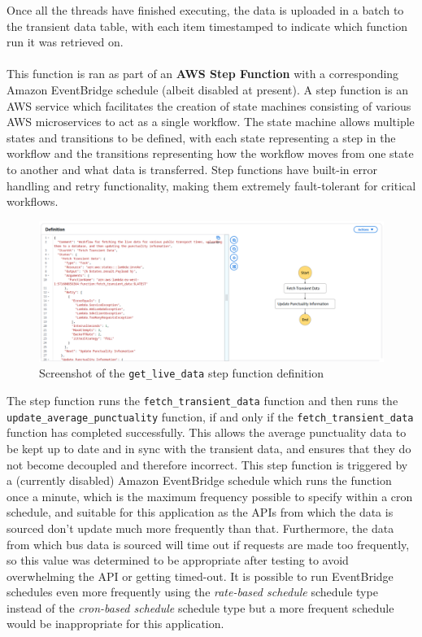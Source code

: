 \documentclass[a4paper,11pt]{report}
\begin{document}
Once all the threads have finished executing, the data is uploaded in a batch to the transient data table, with each item timestamped to indicate which function run it was retrieved on.
\\\\
This function is ran as part of an \textbf{AWS Step Function} with a corresponding Amazon EventBridge schedule (albeit disabled at present).
A step function is an AWS service which facilitates the creation of state machines consisting of various AWS microservices to act as a single workflow.
The state machine allows multiple states and transitions to be defined, with each state representing a step in the workflow and the transitions representing how the workflow moves from one state to another and what data is transferred.
Step functions have built-in error handling and retry functionality, making them extremely fault-tolerant for critical workflows.

\begin{figure}[H]
    \centering
    \includegraphics[width=\textwidth]{./images/get_live_data_definiton.png}
    \caption{Screenshot of the \texttt{get\_live\_data} step function definition}
\end{figure}

The step function runs the \verb|fetch_transient_data| function and then runs the \verb|update_average_punctuality| function, if and only if the \verb|fetch_transient_data| function has completed successfully.
This allows the average punctuality data to be kept up to date and in sync with the transient data, and ensures that they do not become decoupled and therefore incorrect.
This step function is triggered by a (currently disabled) Amazon EventBridge schedule which runs the function once a minute, which is the maximum frequency possible to specify within a cron schedule, and suitable for this application as the APIs from which the data is sourced don't update much more frequently than that.
Furthermore, the data from which bus data is sourced will time out if requests are made too frequently, so this value was determined to be appropriate after testing to avoid overwhelming the API or getting timed-out. 
It is possible to run EventBridge schedules even more frequently using the \textit{rate-based schedule} schedule type instead of the \textit{cron-based schedule} schedule type but a more frequent schedule would be inappropriate for this application.
\end{document}
